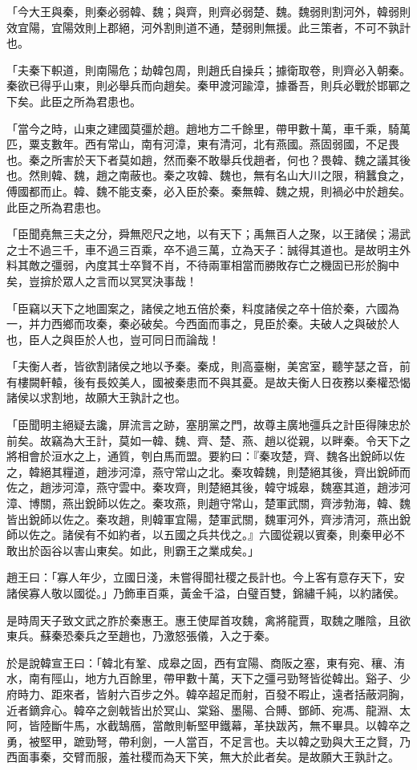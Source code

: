 \begin{pinyinscope}
「今大王與秦，則秦必弱韓、魏；與齊，則齊必弱楚、魏。魏弱則割河外，韓弱則效宜陽，宜陽效則上郡絕，河外割則道不通，楚弱則無援。此三策者，不可不孰計也。

「夫秦下軹道，則南陽危；劫韓包周，則趙氏自操兵；據衛取卷，則齊必入朝秦。秦欲已得乎山東，則必舉兵而向趙矣。秦甲渡河踰漳，據番吾，則兵必戰於邯鄲之下矣。此臣之所為君患也。

「當今之時，山東之建國莫彊於趙。趙地方二千餘里，帶甲數十萬，車千乘，騎萬匹，粟支數年。西有常山，南有河漳，東有清河，北有燕國。燕固弱國，不足畏也。秦之所害於天下者莫如趙，然而秦不敢舉兵伐趙者，何也？畏韓、魏之議其後也。然則韓、魏，趙之南蔽也。秦之攻韓、魏也，無有名山大川之限，稍蠶食之，傅國都而止。韓、魏不能支秦，必入臣於秦。秦無韓、魏之規，則禍必中於趙矣。此臣之所為君患也。

「臣聞堯無三夫之分，舜無咫尺之地，以有天下；禹無百人之聚，以王諸侯；湯武之士不過三千，車不過三百乘，卒不過三萬，立為天子：誠得其道也。是故明主外料其敵之彊弱，內度其士卒賢不肖，不待兩軍相當而勝敗存亡之機固已形於胸中矣，豈揜於眾人之言而以冥冥決事哉！

「臣竊以天下之地圖案之，諸侯之地五倍於秦，料度諸侯之卒十倍於秦，六國為一，并力西鄉而攻秦，秦必破矣。今西面而事之，見臣於秦。夫破人之與破於人也，臣人之與臣於人也，豈可同日而論哉！

「夫衡人者，皆欲割諸侯之地以予秦。秦成，則高臺榭，美宮室，聽竽瑟之音，前有樓闕軒轅，後有長姣美人，國被秦患而不與其憂。是故夫衡人日夜務以秦權恐愒諸侯以求割地，故願大王孰計之也。

「臣聞明主絕疑去讒，屏流言之跡，塞朋黨之門，故尊主廣地彊兵之計臣得陳忠於前矣。故竊為大王計，莫如一韓、魏、齊、楚、燕、趙以從親，以畔秦。令天下之將相會於洹水之上，通質，刳白馬而盟。要約曰：『秦攻楚，齊、魏各出銳師以佐之，韓絕其糧道，趙涉河漳，燕守常山之北。秦攻韓魏，則楚絕其後，齊出銳師而佐之，趙涉河漳，燕守雲中。秦攻齊，則楚絕其後，韓守城皋，魏塞其道，趙涉河漳、博關，燕出銳師以佐之。秦攻燕，則趙守常山，楚軍武關，齊涉勃海，韓、魏皆出銳師以佐之。秦攻趙，則韓軍宜陽，楚軍武關，魏軍河外，齊涉清河，燕出銳師以佐之。諸侯有不如約者，以五國之兵共伐之。』六國從親以賓秦，則秦甲必不敢出於函谷以害山東矣。如此，則霸王之業成矣。」

趙王曰：「寡人年少，立國日淺，未嘗得聞社稷之長計也。今上客有意存天下，安諸侯寡人敬以國從。」乃飾車百乘，黃金千溢，白璧百雙，錦繡千純，以約諸侯。

是時周天子致文武之胙於秦惠王。惠王使犀首攻魏，禽將龍賈，取魏之雕陰，且欲東兵。蘇秦恐秦兵之至趙也，乃激怒張儀，入之于秦。

於是說韓宣王曰：「韓北有鞏、成皋之固，西有宜陽、商阪之塞，東有宛、穰、洧水，南有陘山，地方九百餘里，帶甲數十萬，天下之彊弓勁弩皆從韓出。谿子、少府時力、距來者，皆射六百步之外。韓卒超足而射，百發不暇止，遠者括蔽洞胸，近者鏑弇心。韓卒之劍戟皆出於冥山、棠谿、墨陽、合賻、鄧師、宛馮、龍淵、太阿，皆陸斷牛馬，水截鵠鴈，當敵則斬堅甲鐵幕，革抉跋芮，無不畢具。以韓卒之勇，被堅甲，蹠勁弩，帶利劍，一人當百，不足言也。夫以韓之勁與大王之賢，乃西面事秦，交臂而服，羞社稷而為天下笑，無大於此者矣。是故願大王孰計之。


\end{pinyinscope}
